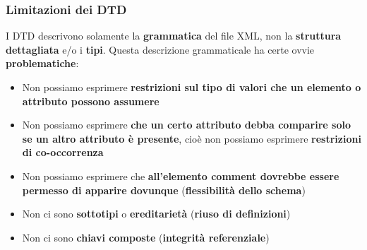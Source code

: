 \documentclass[12pt]{article}
\begin{document}
\subsubsection{Limitazioni dei DTD}
I DTD descrivono solamente la \textbf{grammatica} del file XML, non la \textbf{struttura dettagliata} e/o i \textbf{tipi}.
Questa descrizione grammaticale ha certe ovvie \textbf{problematiche}:
\begin{itemize}
    \item Non possiamo esprimere \textbf{restrizioni sul tipo di valori che un elemento o attributo possono assumere}
    \item Non possiamo esprimere \textbf{che un certo attributo debba comparire solo se un altro attributo è presente}, cioè non possiamo esprimere \textbf{restrizioni di co-occorrenza}
    \item Non possiamo esprimere che \textbf{all'elemento comment dovrebbe essere permesso di apparire dovunque} (\textbf{flessibilità dello schema})
    \item Non ci sono \textbf{sottotipi} o \textbf{ereditarietà} (\textbf{riuso di definizioni})
    \item Non ci sono \textbf{chiavi composte} (\textbf{integrità referenziale})
\end{itemize}
\end{document}
